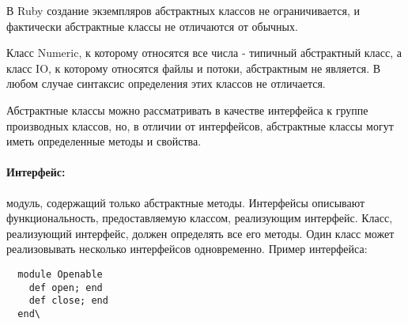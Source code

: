 В Ruby создание экземпляров абстрактных классов не ограничивается, и фактически абстрактные классы не отличаются от обычных.
\begin{note}
  Класс Numeric, к которому относятся все числа - типичный абстрактный класс, а класс IO, к которому относятся файлы и потоки, абстрактным не является. В любом случае синтаксис определения этих классов не отличается.
\end{note}

Абстрактные классы можно рассматривать в качестве интерфейса к группе производных классов, но, в отличии от интерфейсов, абстрактные классы могут иметь определенные методы и свойства.

\paragraph*{Интерфейс:} модуль, содержащий только абстрактные методы. Интерфейсы описывают функциональность, предоставляемую классом, реализующим интерфейс. Класс, реализующий интерфейс, должен определять все его методы. Один класс может реализовывать несколько интерфейсов одновременно.
Пример интерфейса:
\begin{verbatim}
  module Openable
    def open; end
    def close; end
  end\
\end{verbatim}